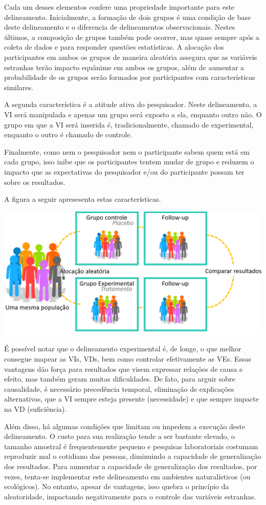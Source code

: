 \documentclass[
]{book}
\begin{document}
Cada um desses elementos confere uma propriedade importante para este delineamento. Inicialmente, a formação de dois grupos é uma condição de base deste delineamento e o diferencia de delineamentos observacionais. Nestes últimos, a composição de grupos também pode ocorrer, mas quase sempre após a coleta de dados e para responder questões estatísticas. A alocação dos participantes em ambos os grupos de maneira aleatória assegura que as variáveis estranhas terão impacto equânime em ambos os grupos, além de aumentar a probabilidade de os grupos serão formados por participantes com características similares.

A segunda característica é a atitude ativa do pesquisador. Neste delineamento, a VI será manipulada e apenas um grupo será exposto a ela, enquanto outro não. O grupo em que a VI será inserida é, tradicionalmente, chamado de experimental, enquanto o outro é chamado de controle.

Finalmente, como nem o pesquisador nem o participante sabem quem está em cada grupo, isso inibe que os participantes tentem mudar de grupo e reduzem o impacto que as expectativas do pesquisador e/ou do participante possam ter sobre os resultados.

A figura a seguir apresesenta estas características.

\includegraphics{./img/cap_experimento.png}

É possível notar que o delineamento experimental é, de longe, o que melhor consegue mapear as VIs, VDs, bem como controlar efetivamente as VEs. Essas vantagens dão força para resultados que visem expressar relações de causa e efeito, mas também geram muitas dificuldades. De fato, para arguir sobre causalidade, é necessário precedência temporal, eliminação de explicações alternativas, que a VI sempre esteja presente (necessidade) e que sempre impacte na VD (suficiência).

Além disso, há algumas condições que limitam ou impedem a execução deste delineamento. O custo para sua realização tende a ser bastante elevado, o tamanho amostral é frequentemente pequeno e pesquisas laboratoriais costumam reproduzir mal o cotidiano das pessoas, diminuindo a capacidade de generalização dos resultados. Para aumentar a capacidade de generalização dos resultados, por vezes, tenta-se implementar este delineamento em ambientes naturalísticos (ou ecológicos). No entanto, apesar de vantagens, isso quebra o princípio da aleatoridade, impactando negativamente para o controle das variáveis estranhas.
\end{document}
